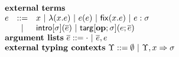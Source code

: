 $\begin{array}{lcl}%
\multicolumn{3}{l}{\textbf{external terms}}\\
e & ::= & \multicolumn{1}{l}{x ~|~ \eanalam{x}{e} ~|~ \eap{e}{e} ~|~ \efix{x}{e} ~|~ \easc{e}{\st}}\\
& ~|~ &\eintro{\st}{\es} ~|~ \etarg{\opname{op}}{\st}{e}{\es}\\
\multicolumn{3}{l}{\textbf{argument lists}~\es ::= \cdot ~|~ \es, e}\\
\multicolumn{3}{l}{\textbf{external typing contexts}~\Upsilon ::=  \emptyset ~|~ \Upsilon, x \Rightarrow \st} %
\end{array}%
$